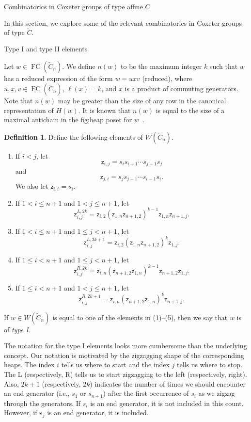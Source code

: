 \documentclass[11pt]{amsart}
\theoremstyle{definition}
\newtheorem{definition}[theorem]{Definition}
\numberwithin{equation}{section}
\newcommand{\C}{\widetilde{C}}
\newcommand{\z}{\mathsf{z}}
\renewcommand{\(}{\left(}
\renewcommand{\)}{\right)}
\DeclareMathOperator{\FC}{FC}
\begin{document}
\begin{section}{Combinatorics in Coxeter groups of type affine $C$}\label{sec:combinatorics}

In this section, we explore some of the relevant combinatorics in Coxeter groups of type $\C$.


\begin{subsection}{Type I and type II elements}

Let $w \in \FC(\C_{n})$.  We define $n(w)$ to be the maximum integer $k$ such that $w$ has a reduced expression of the form $w = u x v$ (reduced), where $u, x, v \in \FC(\C_{n})$, $\ell(x)=k$, and $x$ is a product of commuting generators.  Note that $n(w)$ may be greater than the size of any row in the canonical representation of $H(w)$.  It is known that $n(w)$ is equal to the size of a maximal antichain in the fig:heap poset for $w$~\cite[Lemma 2.9]{Shi2005}.

\begin{definition}\label{def:zigzags}
Define the following elements of $W(\C_{n})$.
\begin{enumerate}
\item If $i<j$, let
\[
\z_{i,j}=s_{i}s_{i+1}\cdots s_{j-1}s_{j}
\]
and
\[
\z_{j,i}=s_{j}s_{j-1}\cdots s_{i-1}s_{i}.
\]
We also let $\z_{i,i}=s_{i}$.

\item If $1< i \leq n+1$ and $1 < j \leq n+1$, let
\[
\z^{L,2k}_{i,j}=\z_{i,2}(\z_{1,n}\z_{n+1,2})^{k-1}\z_{1,n}\z_{n+1,j}.
\]
\item If $1< i \leq n+1$ and $1 \leq j < n+1$, let
\[
\z^{L,2k+1}_{i,j}=\z_{i,2}(\z_{1,n}\z_{n+1,2})^{k}\z_{1,j}.
\]

\item If $1\leq i < n+1$ and $1 \leq j <  n+1$, let
\[
\z^{R,2k}_{i,j}=\z_{i,n}(\z_{n+1,2}\z_{1,n})^{k-1}\z_{n+1,2}\z_{1,j}.
\]
	
\item If $1\leq i < n+1$ and $1 < j \leq  n+1$, let 
\[
\z^{R,2k+1}_{i,j}=\z_{i,n}(\z_{n+1,2}\z_{1,n})^{k}\z_{n+1,j}.
\]

\end{enumerate}
If $w \in W(\C_n)$ is equal to one of the elements in (1)--(5), then we say that $w$ is of \emph{type I}.
\end{definition}

The notation for the type I elements looks more cumbersome than the underlying concept.  Our notation is motivated by the zigzagging shape of the corresponding heaps.  The index $i$ tells us where to start and the index $j$ tells us where to stop.  The L (respectively, R) tells us to start zigzagging to the left (respectively, right).  Also, $2k+1$ (respectively, $2k$) indicates the number of times we should encounter an end generator (i.e., $s_{1}$ or $s_{n+1}$) after the first occurrence of $s_{i}$ as we zigzag through the generators.  If $s_{i}$ is an end generator, it is not included in this count.  However, if $s_{j}$ is an end generator, it is included.  


\end{subsection}
\end{section}
\end{document}
